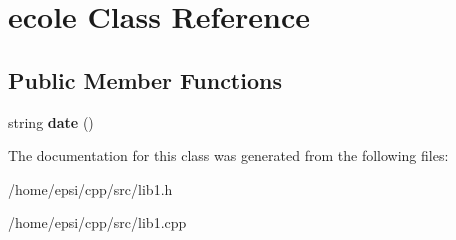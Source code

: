 \hypertarget{classecole}{}\section{ecole Class Reference}
\label{classecole}
\subsection*{Public Member Functions}
\begin{DoxyCompactItemize}
\item 
\mbox{\label{classecole_aa79b4efa905136266241a193a505b439}} 
string {\bfseries date} ()
\end{DoxyCompactItemize}


The documentation for this class was generated from the following files\+:\begin{DoxyCompactItemize}
\item 
/home/epsi/cpp/src/lib1.\+h\item 
/home/epsi/cpp/src/lib1.\+cpp\end{DoxyCompactItemize}
